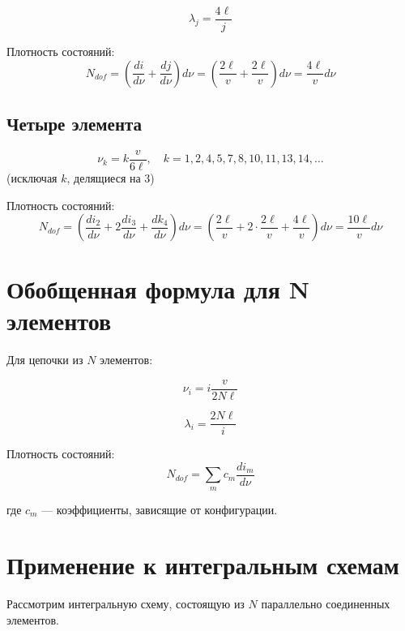 \documentclass[12pt,a4paper]{article}
\begin{document}
\begin{equation}
\lambda_j = \frac{4\ell}{j}
\end{equation}

Плотность состояний:
\begin{equation}
N_{dof} = \left(\frac{di}{d\nu} + \frac{dj}{d\nu}\right) d\nu = \left(\frac{2\ell}{v} + \frac{2\ell}{v}\right) d\nu = \frac{4\ell}{v} d\nu
\end{equation}

\subsection{Четыре элемента}

\begin{equation}
\nu_k = k \frac{v}{6\ell}, \quad k = 1, 2, 4, 5, 7, 8, 10, 11, 13, 14, \ldots
\end{equation}
(исключая $k$, делящиеся на 3)

Плотность состояний:
\begin{equation}
N_{dof} = \left(\frac{di_2}{d\nu} + 2\frac{di_3}{d\nu} + \frac{dk_4}{d\nu}\right) d\nu = \left(\frac{2\ell}{v} + 2\cdot\frac{2\ell}{v} + \frac{4\ell}{v}\right) d\nu = \frac{10\ell}{v} d\nu
\end{equation}

\section{Обобщенная формула для N элементов}

Для цепочки из $N$ элементов:

\begin{equation}
\nu_i = i \frac{v}{2N\ell}
\end{equation}

\begin{equation}
\lambda_i = \frac{2N\ell}{i}
\end{equation}

Плотность состояний:
\begin{equation}
N_{dof} = \sum_{m} c_m \frac{d i_m}{d\nu}
\end{equation}

где $c_m$ --- коэффициенты, зависящие от конфигурации.

\section{Применение к интегральным схемам}

Рассмотрим интегральную схему, состоящую из $N$ параллельно соединенных элементов.
\end{document}

